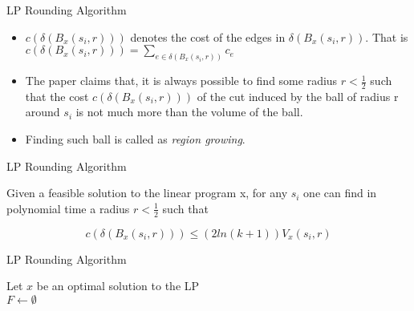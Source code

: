 \documentclass{beamer}
\begin{document}
\begin{frame}{LP Rounding Algorithm}

\begin{itemize}
    \item $ c (\delta(B_x(s_i , r ))) $ denotes the cost of the edges in $\delta(B_x(s_i , r ))$. \newline 
    That is $ c (\delta(B_x(s_i , r ))) = \sum_{e \in \delta(B_x(s_i , r ))} c_e$ \newline

    \pause

    \item The paper claims that, it is always possible to find some radius $r < \frac{1}{2}$ such that the cost $ c(\delta(B_x(s_i , r ))) $ of the cut induced by the ball of radius r around $s_i$ is not much more than the volume of the ball. \newline

    \item Finding such ball is called as \textit{region growing}. 
\end{itemize}
    
\end{frame}


\begin{frame}{LP Rounding Algorithm}

\begin{lemma}[8.7]
    Given a feasible solution to the linear program x, for any $s_i$ one can find
in polynomial time a radius  $r < \frac{1}{2}$ such that

\begin{equation*}
    c(\delta(B_x(s_i , r ))) \leq (2ln(k+1))V_x(s_i, r)
\end{equation*}
\end{lemma}
\end{frame}


\begin{frame}{LP Rounding Algorithm}
  \begin{algorithm}[H]
    \SetAlgoLined

    Let $x$ be an optimal solution to the LP \\
    $F \leftarrow \emptyset$ \\
    
    
    \caption{Algorithm for the multicut problem}
  \end{algorithm}
\end{frame}
\end{document}
